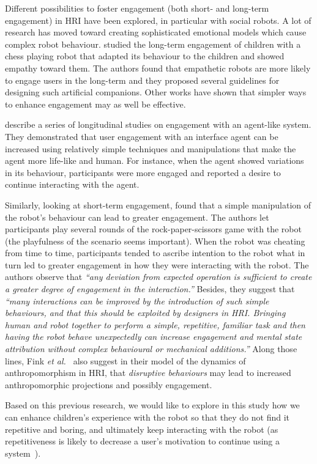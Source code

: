 \documentclass{sig-alternate}
\newcommand{\etal}{{\textit{et al.~}}}
\begin{document}
Different possibilities to foster engagement (both short- and long-term
engagement) in HRI have been explored, in particular with social robots. A lot
of research has moved toward creating sophisticated emotional models which cause
complex robot behaviour. \cite{leite_long-term_2013} studied the long-term
engagement of children with a chess playing robot that adapted its behaviour to
the children and showed empathy toward them. The authors found that empathetic robots
are more likely to engage users in the long-term and they proposed several
guidelines for designing such artificial companions. Other works
\cite{bickmore_maintaining_2010,short_no_2010} have shown that simpler ways to
enhance engagement may as well be effective.

\cite{bickmore_maintaining_2010} describe a series of longitudinal studies on
engagement with an agent-like system. They demonstrated that user engagement
with an interface agent can be increased using relatively simple techniques and
manipulations that make the agent more life-like and human. For instance, when
the agent showed variations in its behaviour, participants were more engaged and
reported a desire to continue interacting with the agent.

Similarly, looking at short-term engagement, \cite{short_no_2010} found that a
simple manipulation of the robot's behaviour can lead to greater engagement. The
authors let participants play several rounds of the rock-paper-scissors game
with the robot (the playfulness of the scenario seems important). When the robot
was cheating from time to time, participants tended to ascribe intention to the
robot what in turn led to greater engagement in how they were interacting with
the robot. The authors observe that \textit{``any deviation from expected
operation is sufficient to create a greater degree of engagement in the
interaction.''} Besides, they suggest that \textit{``many interactions can be
improved by the introduction of such simple behaviours, and that this should
be exploited by designers in HRI. Bringing human and robot together to
perform a simple, repetitive, familiar task and then having the robot behave
unexpectedly can increase engagement and mental state attribution without
complex behavioural or mechanical additions.''}  Along those lines, Fink
\etal\cite{fink2014dynamics} also suggest in their model of the dynamics of
anthropomorphism in HRI, that \emph{disruptive behaviours} may lead to increased
anthropomorphic projections and possibly engagement.

Based on this previous research, we would like to explore in this study how
we can enhance children's experience with the robot so that they do not find it
repetitive and boring, and ultimately keep interacting with the robot (as
repetitiveness is likely to decrease a user's motivation to continue using a
system~\cite{bickmore_establishing_2005}).
\end{document}
